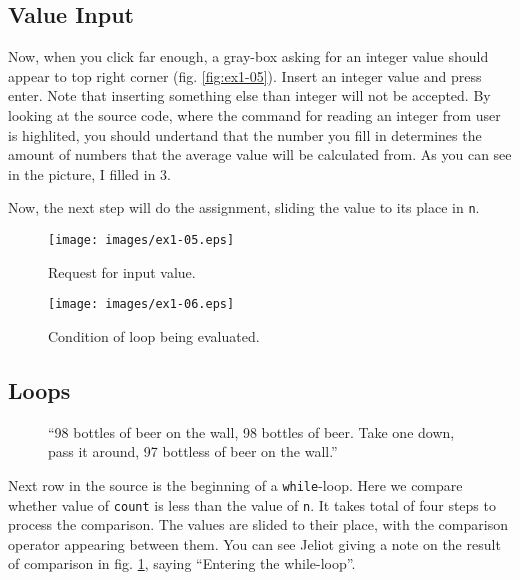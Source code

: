 \documentclass[a4paper,12pt,english]{article}
\newcommand{\jel}{Jeliot}
\newcommand{\p}[1]{\texttt{#1}}
\begin{document}
\subsection{Value Input}

Now, when you click far enough, a gray-box asking for an integer value should appear to top right corner (fig. \ref{fig:ex1-05}). Insert an integer value and press enter. Note that inserting something else than integer will not be accepted. By looking at the source code, where the command for reading an integer from user is highlited, you should undertand that the number you fill in determines the amount of numbers that the average value will be calculated from. As you can see in the picture, I filled in 3.

Now, the next step will do the assignment, sliding the value to its place in \p{n}.

\begin{figure}[ht]
  \begin{minipage}[t]{.49\textwidth}
    \begin{center}  
      \texttt{[image: images/ex1-05.eps]}
      \caption{\label{fig:ex1-05}Request for input value.}
    \end{center}
  \end{minipage}
  \hfill
  \begin{minipage}[t]{.49\textwidth}
    \begin{center}  
      \texttt{[image: images/ex1-06.eps]}
      \caption{\label{fig:ex1-06}Condition of loop being evaluated.}
    \end{center}
  \end{minipage}
\end{figure}

\subsection{Loops}

\begin{wrapfigure}[13]{r}{65mm}
\vspace{-12pt}
``98 bottles of beer on the wall, 98 bottles of beer. Take one down, pass it around, 97 bottless of beer on the wall.''
\end{wrapfigure}

Next row in the source is the beginning of a \p{while}-loop. Here we compare whether value of \p{count} is less than the value of \p{n}. It takes total of four steps to process the comparison. The values are slided to their place, with the comparison operator appearing between them. You can see \jel{} giving a note on the result of comparison in fig. \ref{fig:ex1-06}, saying ``Entering the while-loop''.
\end{document}
